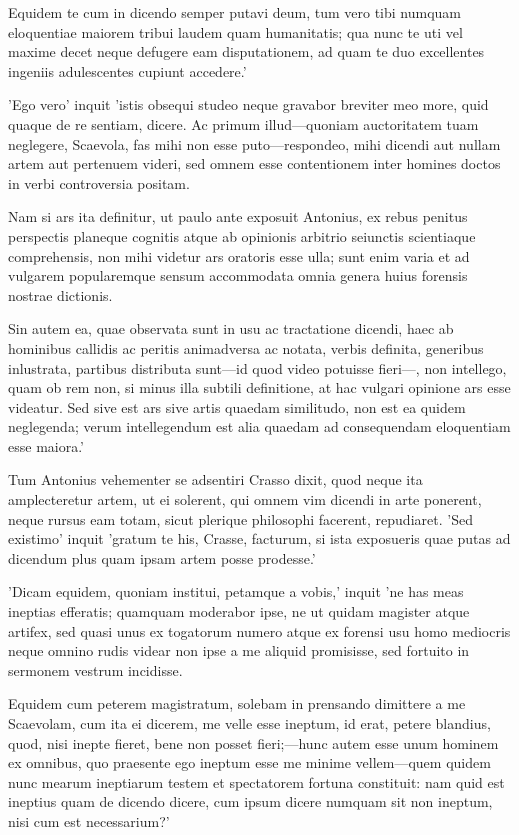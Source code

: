  Equidem te cum in dicendo semper putavi deum, tum vero tibi numquam eloquentiae maiorem tribui laudem quam humanitatis; qua nunc te uti vel maxime decet neque defugere eam disputationem, ad quam te duo excellentes ingeniis adulescentes cupiunt accedere.'

 'Ego vero' inquit 'istis obsequi studeo neque gravabor breviter meo more, quid quaque de re sentiam, dicere. Ac primum illud—quoniam auctoritatem tuam neglegere, Scaevola, fas mihi non esse puto—respondeo, mihi dicendi aut nullam artem aut pertenuem videri, sed omnem esse contentionem inter homines doctos in verbi controversia positam.

 Nam si ars ita definitur, ut paulo ante exposuit Antonius, ex rebus penitus perspectis planeque cognitis atque ab opinionis arbitrio seiunctis scientiaque comprehensis, non mihi videtur ars oratoris esse ulla; sunt enim varia et ad vulgarem popularemque sensum accommodata omnia genera huius forensis nostrae dictionis.

 Sin autem ea, quae observata sunt in usu ac tractatione dicendi, haec ab hominibus callidis ac peritis animadversa ac notata, verbis definita, generibus inlustrata, partibus distributa sunt—id quod video potuisse fieri—, non intellego, quam ob rem non, si minus illa subtili definitione, at hac vulgari opinione ars esse videatur. Sed sive est ars sive artis quaedam similitudo, non est ea quidem neglegenda; verum intellegendum est alia quaedam ad consequendam eloquentiam esse maiora.'

 Tum Antonius vehementer se adsentiri Crasso dixit, quod neque ita amplecteretur artem, ut ei solerent, qui omnem vim dicendi in arte ponerent, neque rursus eam totam, sicut plerique philosophi facerent, repudiaret. 'Sed existimo' inquit 'gratum te his, Crasse, facturum, si ista exposueris quae putas ad dicendum plus quam ipsam artem posse prodesse.'

 'Dicam equidem, quoniam institui, petamque a vobis,' inquit 'ne has meas ineptias efferatis; quamquam moderabor ipse, ne ut quidam magister atque artifex, sed quasi unus ex togatorum numero atque ex forensi usu homo mediocris neque omnino rudis videar non ipse a me aliquid promisisse, sed fortuito in sermonem vestrum incidisse.

 Equidem cum peterem magistratum, solebam in prensando dimittere a me Scaevolam, cum ita ei dicerem, me velle esse ineptum, id erat, petere blandius, quod, nisi inepte fieret, bene non posset fieri;—hunc autem esse unum hominem ex omnibus, quo praesente ego ineptum esse me minime vellem—quem quidem nunc mearum ineptiarum testem et spectatorem fortuna constituit: nam quid est ineptius quam de dicendo dicere, cum ipsum dicere numquam sit non ineptum, nisi cum est necessarium?'

